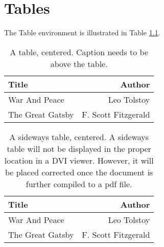 \chapter{Tables}\label{Chap:table}

The Table environment is illustrated in Table \ref{tab:sample}.

\begin{table}[h]
\caption[This will be displayed on the List of Tables.]{A table,
centered. Caption needs to be above the table.\label{tab:sample}}
\begin{center}
\begin{tabular}{|l|r|}
  \hline
Title & Author \\
\hline
War And Peace & Leo Tolstoy \\
The Great Gatsby & F. Scott Fitzgerald \\ \hline
\end{tabular}
\end{center}
\end{table}

\begin{sidewaystable}
\caption[A sideways table.]{A sideways table, centered. A sideways
table will not be displayed in the proper location in a DVI viewer.
However, it will be placed corrected once the document is further
compiled to a pdf file.\label{tab:SidewaysTable}}
\begin{center}
\begin{tabular}{|l|r|}
  \hline
Title & Author \\
\hline
War And Peace & Leo Tolstoy \\
The Great Gatsby & F. Scott Fitzgerald \\ \hline
\end{tabular}
\end{center}

\end{sidewaystable}
